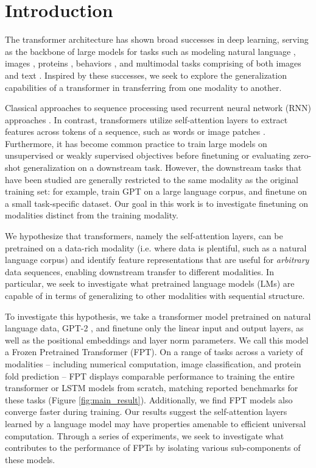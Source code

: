 
\section{Introduction}
\label{sec:intro}

The transformer architecture \citep{vaswani2017attention} has shown broad successes in deep learning, serving as the backbone of large models for tasks such as modeling natural language \citep{brown2020gpt3}, images \citep{dosovitskiy2020vit}, proteins \citep{jumper2021alphafold}, behaviors \citep{abramson2020imitating}, and multimodal tasks comprising of both images and text \citep{lu2019vilbert, radford2021clip}.
Inspired by these successes, we seek to explore the generalization capabilities of a transformer in transferring from one modality to another.

Classical approaches to sequence processing used recurrent neural network (RNN) approaches  \citep{rumelhart1985rnn, hochreiter1997lstm}.
In contrast, transformers utilize self-attention layers to extract features across tokens of a sequence, such as words \citep{vaswani2017attention} or image patches \citep{dosovitskiy2020vit}.
Furthermore, it has become common practice to train large models on unsupervised or weakly supervised objectives before finetuning or evaluating zero-shot generalization on a downstream task.
However, the downstream tasks that have been studied are generally restricted to the same modality as the original training set: for example, train GPT \citep{radford2018gpt} on a large language corpus, and finetune on a small task-specific dataset.
Our goal in this work is to investigate finetuning on modalities distinct from the training modality.

We hypothesize that transformers, namely the self-attention layers, can be pretrained on a data-rich modality (i.e. where data is plentiful, such as a natural language corpus) and identify feature representations that are useful for \emph{arbitrary} data sequences, enabling downstream transfer to different modalities.
In particular, we seek to investigate what pretrained language models (LMs) are capable of in terms of generalizing to other modalities with sequential structure.

To investigate this hypothesis, we take a transformer model pretrained on natural language data, GPT-2 \citep{radford2019gpt2}, and finetune only the linear input and output layers, as well as the positional embeddings and layer norm parameters.
We call this model a Frozen Pretrained Transformer (FPT).
On a range of tasks across a variety of modalities -- including numerical computation, image classification, and protein fold prediction -- FPT displays comparable performance to training the entire transformer or LSTM models from scratch, matching reported benchmarks for these tasks (Figure \ref{fig:main_result}).
Additionally, we find FPT models also converge faster during training.
Our results suggest the self-attention layers learned by a language model may have properties amenable to efficient universal computation.
Through a series of experiments, we seek to investigate what contributes to the performance of FPTs by isolating various sub-components of these models.
